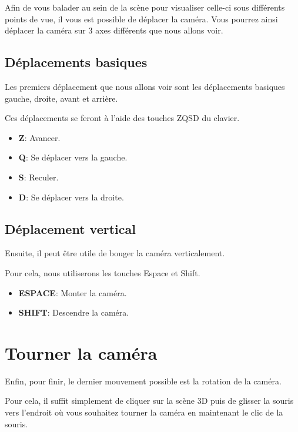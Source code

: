 \documentclass[11pt]{report}
\begin{document}
Afin de vous balader au sein de la scène pour visualiser celle-ci sous différents points de vue, il vous est possible de déplacer la caméra. Vous pourrez ainsi déplacer la caméra sur 3 axes différents que nous allons voir.


\subsection{Déplacements basiques}

\hypertarget{move}{Les premiers déplacement que nous allons voir sont les déplacements basiques gauche, droite, avant et arrière.} Ces déplacements se feront à l'aide des touches ZQSD du clavier.

\begin{itemize}
  \item \textbf{Z}: Avancer.
  \item \textbf{Q}: Se déplacer vers la gauche.
  \item \textbf{S}: Reculer.
  \item \textbf{D}: Se déplacer vers la droite.
\end{itemize}

\subsection{Déplacement vertical}

\hypertarget{moveV}{Ensuite, il peut être utile de bouger la caméra verticalement.} Pour cela, nous utiliserons les touches Espace et Shift.

\begin{itemize}
  \item \textbf{ESPACE}: Monter la caméra.
  \item \textbf{SHIFT}: Descendre la caméra.
\end{itemize}

\section{Tourner la caméra}

\hypertarget{rotate}{Enfin, pour finir, le dernier mouvement possible est la rotation de la caméra.} Pour cela, il suffit simplement de cliquer sur la scène 3D puis de glisser la souris vers l'endroit où vous souhaitez tourner la caméra en maintenant le clic de la souris.
\end{document}
